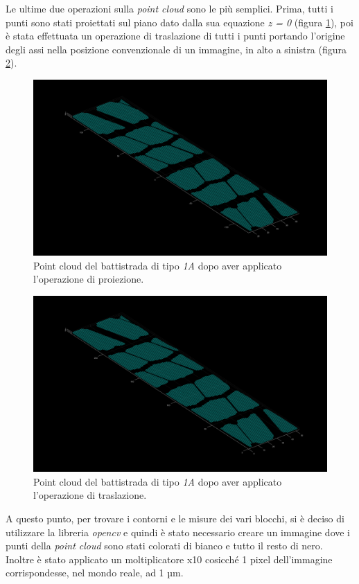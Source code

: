 \noindent Le ultime due operazioni sulla \textit{point cloud} sono le più semplici. Prima, tutti i punti sono stati proiettati sul piano dato dalla sua equazione \textit{z = 0} (figura \ref{fig:batt_1a_analisi_4}), poi è stata effettuata un operazione di traslazione di tutti i punti portando l'origine degli assi nella posizione convenzionale di un immagine, in alto a sinistra (figura \ref{fig:batt_1a_analisi_5}).\\

\begin{figure}[H]
	\centering
	\includegraphics[width=0.8\columnwidth]{./pictures/batt_1a_analisi_4.png}
	\caption{Point cloud del battistrada di tipo \textit{1A} dopo aver applicato l'operazione di proiezione.}\label{fig:batt_1a_analisi_4}
\end{figure}

\begin{figure}[H]
	\centering
	\includegraphics[width=0.8\columnwidth]{./pictures/batt_1a_analisi_5.png}
	\caption{Point cloud del battistrada di tipo \textit{1A} dopo aver applicato l'operazione di traslazione.}\label{fig:batt_1a_analisi_5}
\end{figure}

\noindent A questo punto, per trovare i contorni e le misure dei vari blocchi, si è deciso di utilizzare la libreria \textit{opencv} e quindi è stato necessario creare un immagine dove i punti della \textit{point cloud} sono stati colorati di bianco e tutto il resto di nero.\\
Inoltre è stato applicato un moltiplicatore x10 cosicché 1 pixel dell'immagine corrispondesse, nel mondo reale, ad 1 µm.\\

